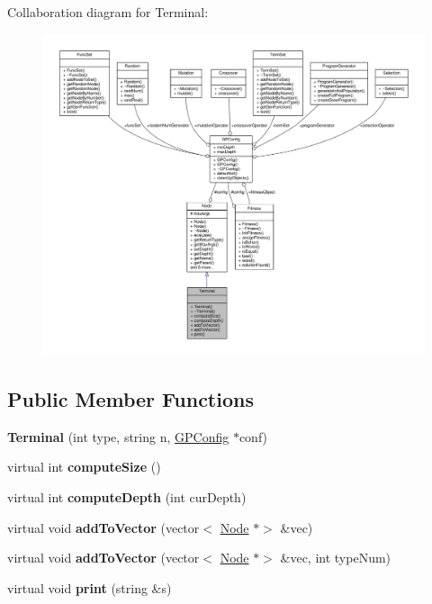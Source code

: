 Collaboration diagram for Terminal\+:
\nopagebreak
\begin{figure}[H]
\begin{center}
\leavevmode
\includegraphics[width=350pt]{classTerminal__coll__graph}
\end{center}
\end{figure}
\subsection*{Public Member Functions}
\begin{DoxyCompactItemize}
\item 
\hypertarget{classTerminal_a8a2fb5e372084c5abcb2ff5172899046}{}\label{classTerminal_a8a2fb5e372084c5abcb2ff5172899046} 
{\bfseries Terminal} (int type, string n, \hyperlink{classGPConfig}{G\+P\+Config} $\ast$conf)
\item 
\hypertarget{classTerminal_a60f1ef99dbc2724ce940f84970040b67}{}\label{classTerminal_a60f1ef99dbc2724ce940f84970040b67} 
virtual int {\bfseries compute\+Size} ()
\item 
\hypertarget{classTerminal_a7577df69e1fdb1cf925235a36ecb6427}{}\label{classTerminal_a7577df69e1fdb1cf925235a36ecb6427} 
virtual int {\bfseries compute\+Depth} (int cur\+Depth)
\item 
\hypertarget{classTerminal_acb06769f16dee46e87d66534aa6b2f2a}{}\label{classTerminal_acb06769f16dee46e87d66534aa6b2f2a} 
virtual void {\bfseries add\+To\+Vector} (vector$<$ \hyperlink{classNode}{Node} $\ast$$>$ \&vec)
\item 
\hypertarget{classTerminal_a7a02b43f97026851878467a862077d53}{}\label{classTerminal_a7a02b43f97026851878467a862077d53} 
virtual void {\bfseries add\+To\+Vector} (vector$<$ \hyperlink{classNode}{Node} $\ast$$>$ \&vec, int type\+Num)
\item 
\hypertarget{classTerminal_ad362c47ced2afaf123a7d9154aba8a1b}{}\label{classTerminal_ad362c47ced2afaf123a7d9154aba8a1b} 
virtual void {\bfseries print} (string \&s)
\end{DoxyCompactItemize}
